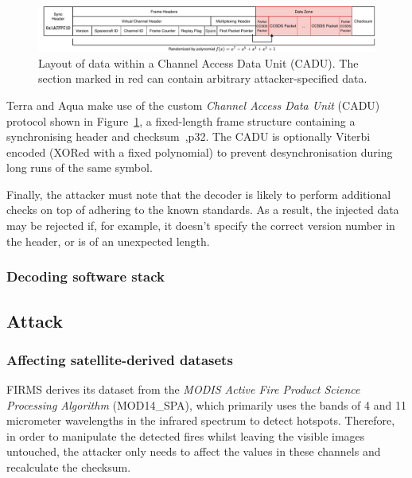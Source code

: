 \begin{figure}
    \centering
    \includegraphics[width=\textwidth]{diagrams/cadu_diagram.pdf}
    \caption{Layout of data within a Channel Access Data Unit (CADU). The section marked in red can contain arbitrary attacker-specified data.}
    \label{fig:cadu_diagram}
\end{figure}

Terra and Aqua make use of the custom \textit{Channel Access Data Unit} (CADU) protocol shown in Figure~\ref{fig:cadu_diagram}, a fixed-length frame structure containing a synchronising header and checksum~\cite{spaceGroundAqua},p32.
The CADU is optionally Viterbi encoded (XORed with a fixed polynomial) to prevent desynchronisation during long runs of the same symbol.

Finally, the attacker must note that the decoder is likely to perform additional checks on top of adhering to the known standards.
As a result, the injected data may be rejected if, for example, it doesn't specify the correct version number in the header, or is of an unexpected length.

\subsubsection{Decoding software stack}


\subsection{Attack}
\subsubsection{Affecting satellite-derived datasets}

% 
% 
% 


FIRMS derives its dataset from the \textit{MODIS Active Fire Product Science Processing Algorithm} (MOD14\_SPA), which primarily uses the bands of 4 and 11 micrometer wavelengths in the infrared spectrum to detect hotspots.
Therefore, in order to manipulate the detected fires whilst leaving the visible images untouched, the attacker only needs to affect the values in these channels and recalculate the checksum.

